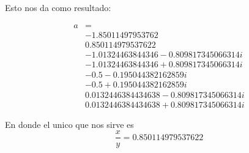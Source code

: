 \documentclass{report}
\begin{document}


Esto nos da como resultado:

\begin{align*}
  a &= \\
  &-1.85011497953762\\
  &0.850114979537622\\
  &-1.01324463844346 - 0.809817345066314 i\\
  &-1.01324463844346 + 0.809817345066314 i\\
  &-0.5 - 0.195044382162859 i\\
  &-0.5 + 0.195044382162859 i\\
  &0.0132446384434638 - 0.809817345066314 i\\
  &0.0132446384434638 + 0.809817345066314 i
\end{align*}

En donde el unico que nos sirve es $$\frac{x}{y} = 0.850114979537622$$
\end{document}
